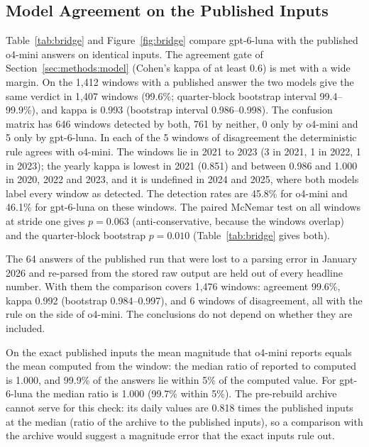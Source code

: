 \subsection{Model Agreement on the Published Inputs}
\label{sec:results:bridge}

Table~\ref{tab:bridge} and Figure~\ref{fig:bridge} compare gpt-6-luna with the published o4-mini answers on identical inputs.
The agreement gate of Section~\ref{sec:methods:model} (Cohen's kappa of at least 0.6) is met with a wide margin. On the 1{,}412 windows with a published answer the two models give the same verdict in 1{,}407 windows (99.6\%; quarter-block bootstrap interval 99.4--99.9\%), and kappa is 0.993 (bootstrap interval 0.986--0.998). The confusion matrix has 646 windows detected by both, 761 by neither, 0 only by o4-mini and 5 only by gpt-6-luna. In each of the 5 windows of disagreement the deterministic rule agrees with o4-mini. The windows lie in 2021 to 2023 (3 in 2021, 1 in 2022, 1 in 2023); the yearly kappa is lowest in 2021 (0.851) and between 0.986 and 1.000 in 2020, 2022 and 2023, and it is undefined in 2024 and 2025, where both models label every window as detected. The detection rates are 45.8\% for o4-mini and 46.1\% for gpt-6-luna on these windows. The paired McNemar test on all windows at stride one gives $p=0.063$ (anti-conservative, because the windows overlap) and the quarter-block bootstrap $p=0.010$ (Table~\ref{tab:bridge} gives both).

The 64 answers of the published run that were lost to a parsing error in January 2026 and re-parsed from the stored raw output are held out of every headline number. With them the comparison covers 1{,}476 windows: agreement 99.6\%, kappa 0.992 (bootstrap 0.984--0.997), and 6 windows of disagreement, all with the rule on the side of o4-mini. The conclusions do not depend on whether they are included.

On the exact published inputs the mean magnitude that o4-mini reports equals the mean computed from the window: the median ratio of reported to computed is 1.000, and 99.9\% of the answers lie within 5\% of the computed value. For gpt-6-luna the median ratio is 1.000 (99.7\% within 5\%). The pre-rebuild archive cannot serve for this check: its daily values are 0.818 times the published inputs at the median (ratio of the archive to the published inputs), so a comparison with the archive would suggest a magnitude error that the exact inputs rule out.

